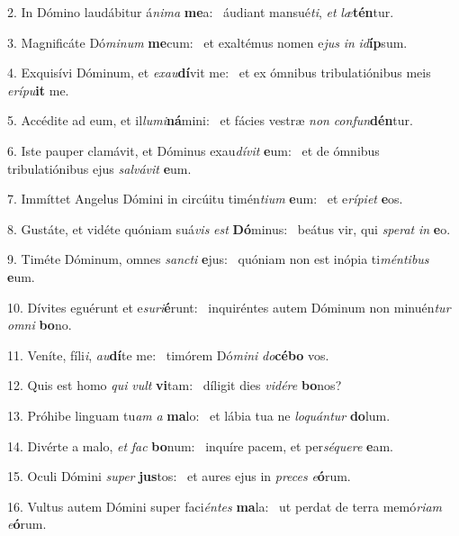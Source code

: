 2. In Dómino laudábitur á\textit{ni}\textit{ma} \textbf{me}a: \ast\  áudiant mansué\textit{ti}, \textit{et} \textit{læ}\textbf{tén}tur.\

3. Magnificáte Dó\textit{mi}\textit{num} \textbf{me}cum: \ast\  et exaltémus nomen e\textit{jus} \textit{in} \textit{id}\textbf{íp}sum.\

4. Exquisívi Dóminum, et \textit{ex}\textit{au}\textbf{dí}vit me: \ast\  et ex ómnibus tribulatiónibus meis \textit{e}\textit{rí}\textit{pu}\textbf{it} me.\

5. Accédite ad eum, et il\textit{lu}\textit{mi}\textbf{ná}mini: \ast\  et fácies vestræ \textit{non} \textit{con}\textit{fun}\textbf{dén}tur.\

6. Iste pauper clamávit, et Dóminus exau\textit{dí}\textit{vit} \textbf{e}um: \ast\  et de ómnibus tribulatiónibus ejus \textit{sal}\textit{vá}\textit{vit} \textbf{e}um.\

7. Immíttet Angelus Dómini in circúitu timén\textit{ti}\textit{um} \textbf{e}um: \ast\  et e\textit{rí}\textit{pi}\textit{et} \textbf{e}os.\

8. Gustáte, et vidéte quóniam suá\textit{vis} \textit{est} \textbf{Dó}minus: \ast\  beátus vir, qui \textit{spe}\textit{rat} \textit{in} \textbf{e}o.\

9. Timéte Dóminum, omnes \textit{sanc}\textit{ti} \textbf{e}jus: \ast\  quóniam non est inópia ti\textit{mén}\textit{ti}\textit{bus} \textbf{e}um.\

10. Dívites eguérunt et e\textit{su}\textit{ri}\textbf{é}runt: \ast\  inquiréntes autem Dóminum non minuén\textit{tur} \textit{om}\textit{ni} \textbf{bo}no.\

11. Veníte, fíli\textit{i}, \textit{au}\textbf{dí}te me: \ast\  timórem Dó\textit{mi}\textit{ni} \textit{do}\textbf{cé}\textbf{bo} vos.\

12. Quis est homo \textit{qui} \textit{vult} \textbf{vi}tam: \ast\  díligit dies \textit{vi}\textit{dé}\textit{re} \textbf{bo}nos?\

13. Próhibe linguam tu\textit{am} \textit{a} \textbf{ma}lo: \ast\  et lábia tua ne \textit{lo}\textit{quán}\textit{tur} \textbf{do}lum.\

14. Divérte a malo, \textit{et} \textit{fac} \textbf{bo}num: \ast\  inquíre pacem, et per\textit{sé}\textit{que}\textit{re} \textbf{e}am.\

15. Oculi Dómini \textit{su}\textit{per} \textbf{jus}tos: \ast\  et aures ejus in \textit{pre}\textit{ces} \textit{e}\textbf{ó}rum.\

16. Vultus autem Dómini super faci\textit{én}\textit{tes} \textbf{ma}la: \ast\  ut perdat de terra memó\textit{ri}\textit{am} \textit{e}\textbf{ó}rum.\


